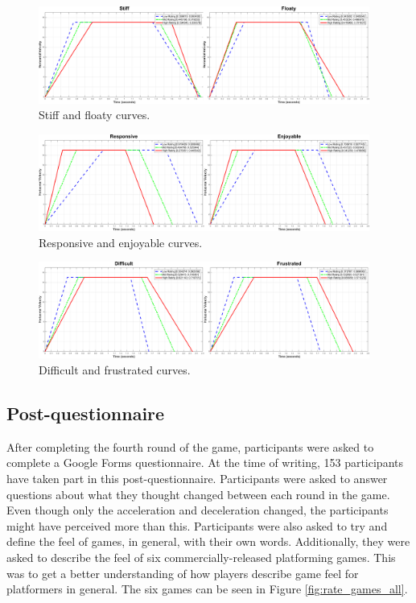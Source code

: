 \begin{figure}[!htb]
\centering
\includegraphics[width=0.97\textwidth]{Pics/Curves/stiff_floaty}
\caption{Stiff and floaty curves.}
\label{fig:stiff_floaty}
\end{figure}

\begin{figure}[!htb]
\centering
\includegraphics[width=0.97\textwidth]{Pics/Curves/responsive_enjoyable}
\caption{Responsive and enjoyable curves.}
\label{fig:responsive_enjoyable}
\end{figure}

\begin{figure}[!htb]
\centering
\includegraphics[width=0.97\textwidth]{Pics/Curves/difficult_frustrated}
\caption{Difficult and frustrated curves.}
\label{fig:difficult_frustrated}
\end{figure}

\subsection{Post-questionnaire}
After completing the fourth round of the game, participants were asked to complete a Google Forms questionnaire. At the time of writing, 153 participants have taken part in this post-questionnaire. Participants were asked to answer questions about what they thought changed between each round in the game. Even though only the acceleration and deceleration changed, the participants might have perceived more than this. Participants were also asked to try and define the feel of games, in general, with their own words. Additionally, they were asked to describe the feel of six commercially-released platforming games. This was to get a better understanding of how players describe game feel for platformers in general. The six games can be seen in Figure \ref{fig:rate_games_all}.

